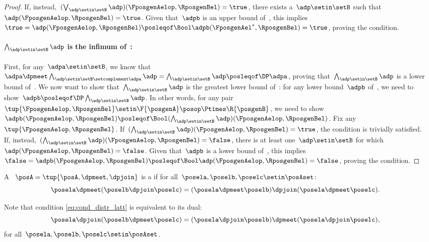 \begin{proof}
    If, instead,~$(\bigvee_{\adp \setin \setB} \adp)(\FposgenAelop,\RposgenBel)=\true$, there exists a~$\adp\setin \setB$ such that~$\adp(\FposgenAelop,\RposgenBel)=\true$.
    Given that~$\adpb$ is an upper bound of~\setB, this implies~$\true=\adp(\FposgenAelop,\RposgenBel)\posleqof\Bool \adpb(\FposgenAel^*,\RposgenBel)=\true$, proving the condition.

    \paragraph*{$\bigwedge_{\adp \setin \setB} \adp$ is the infimum of~\setB:}
    First, for any~$\adpa\setin \setB$, we know that~$\adpa \dpmeet \bigwedge_{\adp \setin \setB \setcomplement \adpa} \adp= \bigwedge_{\adp \setin \setB} \adp \posleqof\DP \adpa$, proving that~$\bigwedge_{\adp \setin \setB} \adp$ is a lower bound of~\setB.
    We now want to show that~$\bigwedge_{\adp \setin \setB} \adp$ is the greatest lower bound of~\setB: for any lower bound~$\adpb$ of~\setB, we need to show~$\adpb\posleqof\DP\bigwedge_{\adp \setin \setB} \adp $.
    In other words, for any pair~$\tup{\FposgenAelop,\RposgenBel}\setin \F{\posgenA}\posop \Ptimes \R{\posgenB}$, we need to show~$\adpb(\FposgenAelop,\RposgenBel) \posleqof\Bool (\bigwedge_{\adp \setin \setB} \adp)(\FposgenAelop,\RposgenBel)$.
    Fix any~$\tup{\FposgenAelop,\RposgenBel}$.
    If~$(\bigwedge_{\adp \setin \setB} \adp)(\FposgenAelop,\RposgenBel)=\true$, the condition is trivially satisfied.
    If, instead,~$(\bigwedge_{\adp \setin \setB} \adp)(\FposgenAelop,\RposgenBel)=\false$, there is at least one~$\adp\setin \setB$ for which~$\adp(\FposgenAelop,\RposgenBel)=\false$.
    Given that~$\adpb$ is a lower bound of~\setB, this implies~$\false=\adpb(\FposgenAelop,\RposgenBel)\posleqof\Bool \adp(\FposgenAelop,\RposgenBel)=\false$, proving the condition.
\end{proof}

\begin{definition}
    \label{def:distributive-lattice}
    A ~$\posA=\tup{\posA,{{\dpmeet}}, {{\dpjoin}}}$ is a  if for all~$\posela,\poselb,\poselc\setin \posAset$:
    \begin{equation}
        \label{eq:cond_distr_latt}
        \posela \dpmeet (\poselb \dpjoin \poselc)=(\posela \dpmeet \poselb)\dpjoin (\posela \dpmeet \poselc).
    \end{equation}
\end{definition}
\begin{remark}
    Note that condition \cref{eq:cond_distr_latt} is equivalent to its dual:
    \begin{equation}
        \posela \dpjoin (\poselb\dpmeet \poselc)=(\posela \dpjoin \poselb)\dpmeet (\posela\dpjoin \poselc),
    \end{equation}
    for all~$\posela,\poselb,\poselc\setin \posAset$.
\end{remark}

